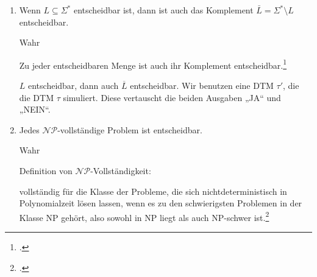 \documentclass{bschlangaul-aufgabe}
\begin{document}
\begin{enumerate}

\item Wenn $L \subseteq \Sigma^*$ entscheidbar ist, dann ist auch das
Komplement $\bar L = \Sigma^* \setminus L$ entscheidbar.

\begin{bAntwort}
Wahr

Zu jeder entscheidbaren Menge ist auch ihr Komplement
entscheidbar.\footcite{wiki:entscheidbar}

$L$ entscheidbar, dann auch $\overline{L}$ entscheidbar. Wir benutzen
eine DTM $\tau'$, die die DTM $\tau$ simuliert. Diese vertauscht die
beiden Ausgaben „JA“ und „NEIN“.
\end{bAntwort}


\item Jedes $\mathcal{NP}$-vollständige Problem ist entscheidbar.

\begin{bAntwort}
Wahr

Definition von $\mathcal{NP}$-Vollständigkeit:

vollständig für die Klasse der Probleme, die sich nichtdeterministisch
in Polynomialzeit lösen lassen, wenn es zu den schwierigsten Problemen
in der Klasse NP gehört, also sowohl in NP liegt als auch NP-schwer
ist.\footcite{wiki:np-vollstaendig}
\end{bAntwort}
\end{enumerate}
\end{document}
